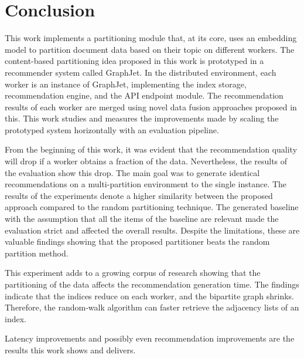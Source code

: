 \chapter{Conclusion}

This work implements a partitioning module that, at its core, uses an embedding model to partition document data based on their topic on different workers. The content-based partitioning idea proposed in this work is prototyped in a recommender system called GraphJet. In the distributed environment, each worker is an instance of GraphJet, implementing the index storage, recommendation engine, and the API endpoint module. The recommendation results of each worker are merged using novel data fusion approaches proposed in this. This work studies and measures the improvements made by scaling the prototyped system horizontally with an evaluation pipeline.


From the beginning of this work, it was evident that the recommendation quality will drop if a worker obtains a fraction of the data. Nevertheless, the results of the evaluation show this drop. The main goal was to generate identical recommendations on a multi-partition environment to the single instance. The results of the experiments denote a higher similarity between the proposed approach compared to the random partitioning technique. The generated baseline with the assumption that all the items of the baseline are relevant made the evaluation strict and affected the overall results. Despite the limitations, these are valuable findings showing that the proposed partitioner beats the random partition method.


This experiment adds to a growing corpus of research showing that the partitioning of the data affects the recommendation generation time. The findings indicate that the indices reduce on each worker, and the bipartite graph shrinks. Therefore, the random-walk algorithm can faster retrieve the adjacency lists of an index.


Latency improvements and possibly even recommendation improvements are the results this work shows and delivers.
